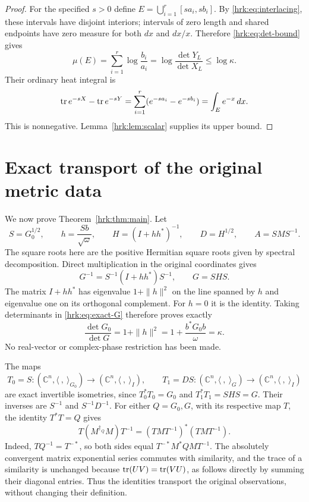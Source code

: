 \documentclass[11pt]{article}
\begin{document}
\begin{proof}
For the specified $s>0$ define
$E=\bigcup_{i=1}^r[sa_i,sb_i]$. By \eqref{hrk:eq:interlacing}, these
intervals have disjoint interiors; intervals of zero length and
shared endpoints have zero measure for both $dx$ and $dx/x$.
Therefore \eqref{hrk:eq:det-bound} gives
\[
 \mu(E)=\sum_{i=1}^r\log\frac{b_i}{a_i}
       =\log\frac{\det Y_L}{\det X_L}\leq\log\kappa.
\]
Their ordinary heat integral is
\[
 \operatorname{tr} e^{-sX}-\operatorname{tr} e^{-sY}
   =\sum_{i=1}^r(e^{-sa_i}-e^{-sb_i})
   =\int_E e^{-x}\,dx.
\]
This is nonnegative. Lemma~\ref{hrk:lem:scalar} supplies its upper bound.
\end{proof}

\section{Exact transport of the original metric data}
We now prove Theorem~\ref{hrk:thm:main}. Let
\begin{equation}\label{hrk:eq:transport-data}
 S=G_0^{1/2},\qquad h=\frac{Sb}{\sqrt\omega},\qquad
 H=(I+hh^*)^{-1},\qquad D=H^{1/2},\qquad A=SMS^{-1}.
\end{equation}
The square roots here are the positive Hermitian square roots given
by spectral decomposition. Direct multiplication in the original
coordinates gives
\begin{equation}\label{hrk:eq:exact-G}
 G^{-1}=S^{-1}(I+hh^*)S^{-1},\qquad G=SHS.
\end{equation}
The matrix $I+hh^*$ has eigenvalue $1+\|h\|^2$ on the line spanned
by $h$ and eigenvalue one on its orthogonal complement. For $h=0$
it is the identity. Taking determinants in \eqref{hrk:eq:exact-G}
therefore proves exactly
\[
 \frac{\det G_0}{\det G}=1+\|h\|^2
                    =1+\frac{b^*G_0b}{\omega}=\kappa.
\]
No real-vector or complex-phase restriction has been made.

The maps
\begin{equation}\label{hrk:eq:isometries}
 T_0=S:(\mathbb C^n,\langle\ ,\ \rangle_{G_0})
          \longrightarrow(\mathbb C^n,\langle\ ,\ \rangle_I),
 \qquad
 T_1=DS:(\mathbb C^n,\langle\ ,\ \rangle_G)
          \longrightarrow(\mathbb C^n,\langle\ ,\ \rangle_I)
\end{equation}
are exact invertible isometries, since $T_0^*T_0=G_0$ and
$T_1^*T_1=SHS=G$. Their inverses are $S^{-1}$ and $S^{-1}D^{-1}$.
For either $Q=G_0,G$, with its respective map $T$, the identity
$T^*T=Q$ gives
\begin{equation}\label{hrk:eq:adjoint-intertwining}
 T(M^{\dagger_Q}M)T^{-1}
   =(TMT^{-1})^*(TMT^{-1}).
\end{equation}
Indeed, $TQ^{-1}=T^{-*}$, so both sides equal
$T^{-*}M^*QM T^{-1}$. The absolutely convergent matrix exponential
series commutes with similarity, and the trace of a similarity
is unchanged because $\operatorname{tr}(UV)=\operatorname{tr}(VU)$, as follows directly by
summing their diagonal entries. Thus the identities transport the
original observations, without changing their definition.
\end{document}
